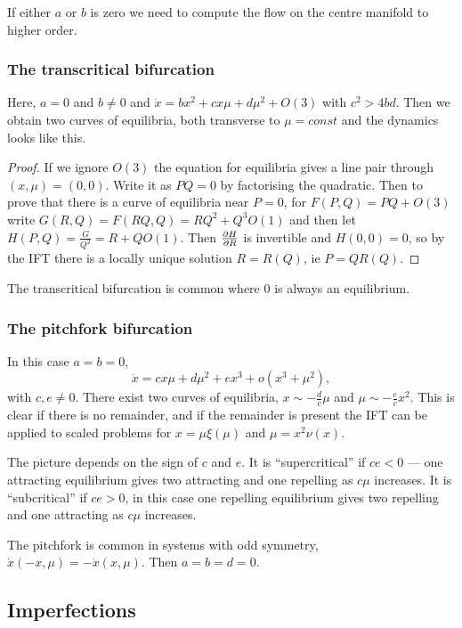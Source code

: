 \documentclass{notes}
\theoremstyle{plain}
\begin{document}
If either $a$ or $b$ is zero we need to compute the flow on the centre
manifold to higher order.

\subsubsection*{The transcritical bifurcation}

\parbox{3in}
{Here, $a=0$ and $b \neq 0$ and $\dot{x} = b x^2 + c x \mu + d\mu^2 + O(3)$
with $c^2 > 4 b d$.  Then we obtain two curves of equilibria, both
transverse to $\mu = const$ and the dynamics looks like this.}

\begin{proof}
If we ignore $O(3)$ the equation for equilibria gives a line pair through
$(x,\mu) =  (0,0)$.  Write it as $PQ = 0$ by factorising the quadratic.
Then to prove that there is a curve of equilibria near $P=0$,
for $F(P,Q) = PQ + O(3)$ write $G(R,Q) = F(RQ,Q) = RQ^2 + Q^3 O(1)$ and
then let $H(P,Q) = \frac{G}{Q^2} = R + Q O(1)$.  Then $\frac{\partial H}{\partial R}$ is
invertible and $H(0,0) = 0$, so by the IFT there is a locally unique solution
$R=R(Q)$, ie $P = QR(Q)$.
\end{proof}

The transcritical bifurcation is common where $0$ is always an equilibrium.

\subsubsection*{The pitchfork bifurcation}

\parbox{3in}
{In this case $a=b=0$,
\[
\dot{x} = c x \mu + d \mu^2 + e x^3 +o(x^3 + \mu^2),
\]
with $c,e \neq 0$.  There exist two curves of equilibria,
$x \sim - \frac{d}{c} \mu$ and $\mu \sim - \frac{e}{c} x^2$.  This is
clear if there is no remainder, and if the remainder is present the
IFT can be applied to scaled problems for $x = \mu \xi(\mu)$ and
$\mu = x^2 \nu(x)$.
}

The picture depends on the sign of $c$ and $e$.  It is ``supercritical''
if $ce < 0$ --- one attracting equilibrium gives two attracting and one
repelling as $c \mu$ increases.  It is ``subcritical'' if $ce > 0$, in
this case one repelling equilibrium gives two repelling and one
attracting as $c \mu$ increases.

The pitchfork is common in systems with odd symmetry,
$\dot{x}(-x,\mu) = - \dot{x}(x,\mu)$.  Then $a=b=d=0$.

\subsection{Imperfections}
\end{document}
